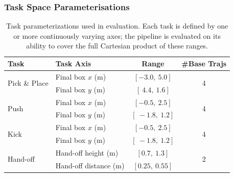 \documentclass{article}
\begin{document}
\subsubsection{Task Space Parameterisations}
\begin{table}[h]
\centering
\caption{Task parameterizations used in evaluation. Each task is defined 
by one or more continuously varying axes; the pipeline is evaluated on 
its ability to cover the full Cartesian product of these ranges.}
\label{tab:task_params}
\renewcommand{\arraystretch}{1.2}
\begin{tabular}{llcc}
\toprule
\textbf{Task} & \textbf{Task Axis} & \textbf{Range} & \textbf{\#Base Trajs} \\
\midrule
\multirow{2}{*}{Pick \& Place} 
  & Final box $x$ (m) & $[-3.0,\ 5.0]$ & \multirow{2}{*}{4} \\
  & Final box $y$ (m) & $[\ 4.4,\ 1.6]$ & \\
\midrule
\multirow{2}{*}{Push}
  & Final box $x$ (m) & $[-0.5,\ 2.5]$ & \multirow{2}{*}{4} \\
  & Final box $y$ (m) & $[\ -1.8,\ 1.2]$ & \\
\midrule
\multirow{2}{*}{Kick}
  & Final box $x$ (m) & $[-0.5,\ 2.5]$ & \multirow{2}{*}{4} \\
  & Final box $y$ (m) & $[\ -1.8,\ 1.2]$ & \\
\midrule
\multirow{2}{*}{Hand-off}
  & Hand-off height (m)   & $[0.7,\ 1.3]$ & \multirow{2}{*}{2} \\
  & Hand-off distance (m) & $[0.25,\ 0.55]$ & \\
\bottomrule
\end{tabular}
\end{table}
\end{document}
